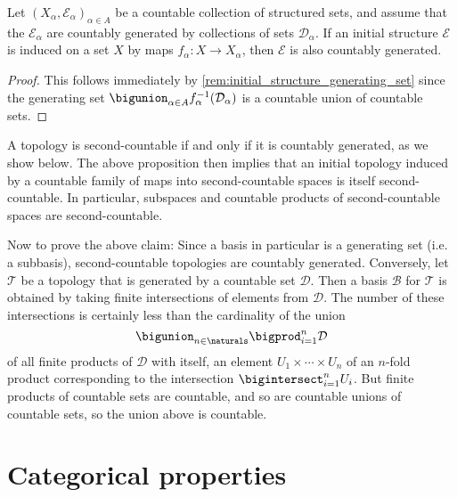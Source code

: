 \documentclass[article, a4paper, 11pt, oneside]{memoir}
\numberwithin{equation}{chapter}
\newcommand{\calT}{\mathcal{T}}
\newcommand{\calB}{\mathcal{B}}
\newcommand{\calE}{\mathcal{E}}
\newcommand{\calD}{\mathcal{D}}
\begin{document}
\begin{proposition}
    Let $(X_\alpha,\calE_\alpha)_{\alpha \in A}$ be a countable collection of structured sets, and assume that the $\calE_\alpha$ are countably generated by collections of sets $\calD_\alpha$. If an initial structure $\calE$ is induced on a set $X$ by maps $f_\alpha \colon X \to X_\alpha$, then $\calE$ is also countably generated.
\end{proposition}

\begin{proof}
    This follows immediately by \cref{rem:initial_structure_generating_set} since the generating set $\bigunion_{\alpha \in A} f_\alpha^{-1}(\calD_\alpha)$ is a countable union of countable sets.
\end{proof}


\begin{examplebreak}
    \label{ex:second_countable_space}
    A topology is second-countable if and only if it is countably generated, as we show below. The above proposition then implies that an initial topology induced by a countable family of maps into second-countable spaces is itself second-countable. In particular, subspaces and countable products of second-countable spaces are second-countable.
    
    Now to prove the above claim: Since a basis in particular is a generating set (i.e. a subbasis), second-countable topologies are countably generated. Conversely, let $\calT$ be a topology that is generated by a countable set $\calD$. Then a basis $\calB$ for $\calT$ is obtained by taking finite intersections of elements from $\calD$. The number of these intersections is certainly less than the cardinality of the union
    \begin{equation*}
        \bigunion_{n \in \naturals} \bigprod_{i=1}^n \calD
    \end{equation*}
    of all finite products of $\calD$ with itself, an element $U_1 \times \cdots \times U_n$ of an $n$-fold product corresponding to the intersection $\bigintersect_{i=1}^n U_i$. But finite products of countable sets are countable, and so are countable unions of countable sets, so the union above is countable.
\end{examplebreak}



\section{Categorical properties} \label{sec:structure_categorical}
\end{document}

